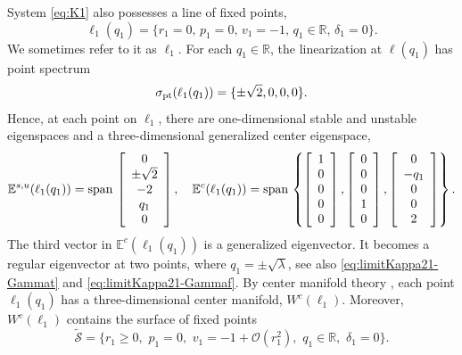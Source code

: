 \documentclass[11pt]{article}
\numberwithin{equation}{section}
\begin{document}
System \eqref{eq:K1} also possesses a line of fixed points, 
\begin{equation}\label{eq:ell1}
   \ell_1(q_1) = \{ r_1=0, \, p_1 = 0, \, v_1 = -1, \, q_1 \in \mathbb{R}, \, \delta_1=0\}.
\end{equation}
We sometimes refer to it as $\ell_1$.
For each $q_1 \in \mathbb{R}$, the linearization at $\ell(q_1)$ has point spectrum
\begin{equation*}
    \sigma_{\rm pt} (\ell_1(q_1)) = \{ \pm \sqrt{2}, 0, 0, 0 \}.
\end{equation*}
Hence, at each point on $\ell_1$, there are one-dimensional stable and unstable eigenspaces and a three-dimensional generalized center eigenspace,
\begin{equation*}
    \mathbb{E}^{s,u}(\ell_1(q_1)) = {\rm span} \, 
    \left[ \begin{array}{c} 
    0 \\ \pm \sqrt{2} \\ -2 \\ q_1 \\ 0 
    \end{array} \right], 
\quad 
    \mathbb{E}^{c} (\ell_1(q_1)) = {\rm span} \,
    \left\{ 
    \left[ \begin{array}{c} 
    1 \\ 0 \\ 0 \\ 0 \\ 0 
    \end{array} \right],
    \left[ \begin{array}{c} 
    0 \\ 0 \\ 0 \\ 1 \\ 0 
    \end{array} \right],  
    \left[ \begin{array}{c} 
    0 \\ -q_1 \\ 0 \\ 0 \\ 2 
    \end{array} \right]
    \right\}.
\end{equation*}
The third vector in $\mathbb{E}^c(\ell_1(q_1))$ is a generalized eigenvector. 
It becomes a regular eigenvector at two points, where $q_1=\pm\sqrt{\lambda}$, see also \eqref{eq:limitKappa21-Gammat} and \eqref{eq:limitKappa21-Gammaf}.
By center manifold theory \cite{C1981,GH1983,HPS1977}, each point $\ell_1(q_1)$ has a three-dimensional center manifold, $W^c(\ell_1)$.
Moreover, $W^c(\ell_1)$ contains the surface of fixed points
\begin{equation}\label{eq:tildeS}
    \tilde{\mathcal{S}} = \{ r_1\ge 0, \, \, p_1=0, \, \, v_1=-1+\mathcal{O}(r_1^2), \, \, q_1 \in \mathbb{R}, \, \, \delta_1=0 \}.
\end{equation}
\end{document}
